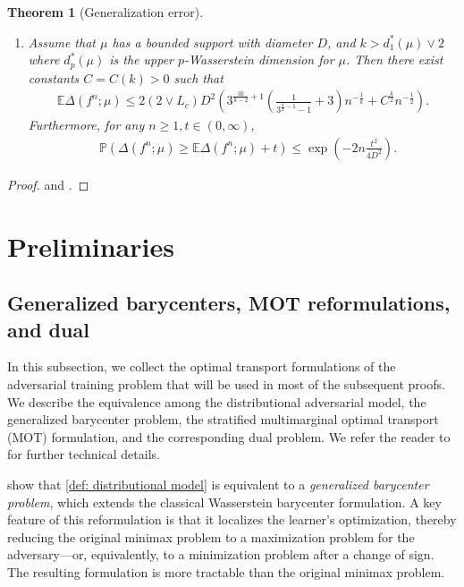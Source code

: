 \documentclass{amsart}
\theoremstyle{plain}
\numberwithin{equation}{section}\newtheorem{theorem}{Theorem}[section]
\theoremstyle{remark}
\begin{document}
\begin{theorem}[Generalization error]
\begin{enumerate}
    \item[(ii)] Assume that $\mu$ has a bounded support with diameter $D$, and $k > d^*_1(\mu) \vee 2$ where $d^*_p(\mu)$ is the upper $p$-Wasserstein dimension for $\mu$. Then there exist constants $C=C(k) > 0$ such that
\begin{align*}
    \mathbb{E} \Delta(f^n;\mu) \leq 2 (2 \vee L_c) D^2  \left(3^{\frac{3k}{k - 2} + 1}\left( \frac{1}{3^{\frac{k}{2} - 1} - 1} + 3 \right) n^{- \frac{1}{k}} + C^{\frac{k}{2}} n^{- \frac{1}{2}} \right). 
\end{align*}
Furthermore, for any $n \geq 1, t \in (0,\infty)$,
\begin{align*}
    &\mathbb{P} \left(  \Delta(f^n;\mu) \geq \mathbb{E}  \Delta(f^n;\mu) + t \right) \leq \exp\left(-2n\frac{t^2}{4D^2} \right).
\end{align*}
\end{enumerate}    
\end{theorem}


\begin{proof}
 and .    
\end{proof}







\section{Preliminaries}

\subsection{Generalized barycenters, MOT reformulations, and dual}


In this subsection, we collect the optimal transport formulations of the adversarial training problem that will be used in most of the subsequent proofs. We describe the equivalence among the distributional adversarial model, the generalized barycenter problem, the stratified multimarginal optimal transport (MOT) formulation, and the corresponding dual problem. We refer the reader to \cite{jakwang_MOT, jakwang_2024existence} for further technical details.



\citet{jakwang_MOT} show that \eqref{def: distributional model} is equivalent to a \emph{generalized barycenter problem}, which extends the classical Wasserstein barycenter formulation. A key feature of this reformulation is that it localizes the learner’s optimization, thereby reducing the original minimax problem to a maximization problem for the adversary—or, equivalently, to a minimization problem after a change of sign. The resulting formulation is more tractable than the original minimax problem.
\end{document}
